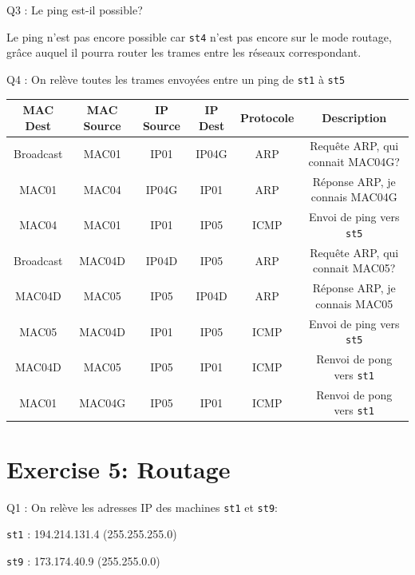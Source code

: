 \documentclass[11pt, openright]{book}
\begin{document}
\begin{dent}{Q3 :} Le ping est-il possible?
	
	Le ping n'est pas encore possible car \texttt{st4} n'est pas encore sur le mode routage, grâce auquel il pourra router les trames entre les réseaux correspondant. 
\end{dent}

\begin{dent}{Q4 :} On relève toutes les trames envoyées entre un ping de \texttt{st1} à \texttt{st5}
	
	\begin{tabular}{|c|c|c|c|c|c|}
		\hline
		MAC Dest  & MAC Source & IP Source & IP Dest & Protocole & Description                      \\
		\hline
		Broadcast & MAC01      & IP01      & IP04G   & ARP       & Requête ARP, qui connait MAC04G? \\
		\hline
		MAC01     & MAC04      & IP04G     & IP01    & ARP       & Réponse ARP, je connais MAC04G   \\
		\hline
		MAC04     & MAC01      & IP01      & IP05    & ICMP      & Envoi de ping vers \texttt{st5}  \\
		\hline
		Broadcast & MAC04D     & IP04D     & IP05    & ARP       & Requête ARP, qui connait MAC05?  \\
		\hline
		MAC04D    & MAC05      & IP05      & IP04D   & ARP       & Réponse ARP, je connais MAC05    \\
		\hline
		MAC05     & MAC04D     & IP01      & IP05    & ICMP      & Envoi de ping vers \texttt{st5}  \\
		\hline
		MAC04D    & MAC05      & IP05      & IP01    & ICMP      & Renvoi de pong vers \texttt{st1} \\
		\hline
		MAC01     & MAC04G     & IP05      & IP01    & ICMP      & Renvoi de pong vers \texttt{st1} \\
		\hline
	\end{tabular}
\end{dent}

\newpage

\section{Exercise 5: Routage}

\begin{dent}{Q1 :}
	On relève les adresses IP des machines \texttt{st1} et \texttt{st9}:
	\begin{items}{-15pt}{-15pt}
		\item \texttt{st1} : 194.214.131.4 (255.255.255.0)
		\item \texttt{st9} : 173.174.40.9 (255.255.0.0)
	\end{items}
\end{dent}
\end{document}
